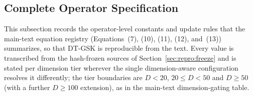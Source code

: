 \documentclass[algorithms,article,submit,moreauthors,pdftex]{Definitions/mdpi}
\newcommand{\dtgsk}{DT-GSK}
\begin{document}
\subsection{Complete Operator Specification}\label{sec:repro:opspec}

This subsection records the operator-level constants and update rules that the
main-text equation registry (Equations~(7), (10), (11), (12), and~(13)) summarizes, so
that \dtgsk{} is reproducible from the text.  Every value is transcribed from
the hash-frozen sources of Section~\ref{sec:repro:freeze} and is stated per
dimension tier wherever the single dimension-aware configuration resolves it
differently; the tier boundaries are $D<20$, $20\le D<50$ and $D\ge 50$ (with a
further $D\ge 100$ extension), as in the main-text dimension-gating table.
\end{document}
